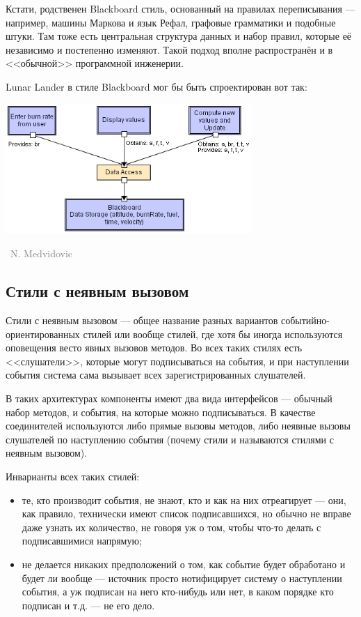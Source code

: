 \documentclass[a5paper]{article}
\newcommand{\attribution}[1] {
    \vspace{-4mm}\begin{flushright}\begin{scriptsize}\textcolor{gray}
    {\textcopyright\, #1}\end{scriptsize}\end{flushright}
}
\begin{document}
Кстати, родственен Blackboard стиль, основанный на правилах переписывания --- например, машины Маркова и язык Рефал, графовые грамматики и подобные штуки. Там тоже есть центральная структура данных и набор правил, которые её независимо и постепенно изменяют. Такой подход вполне распространён и в <<обычной>> программной инженерии.

Lunar Lander в стиле Blackboard мог бы быть спроектирован вот так:

\begin{center}
    \includegraphics[width=0.7\textwidth]{blackboardLL.png}
    \attribution{N. Medvidovic}
\end{center}

\subsection{Стили с неявным вызовом}

Стили с неявным вызовом --- общее название разных вариантов событийно-ориентированных стилей или вообще стилей, где хотя бы иногда используются оповещения весто явных вызовов методов. Во всех таких стилях есть <<слушатели>>, которые могут подписываться на события, и при наступлении события система сама вызывает всех зарегистрированных слушателей.

В таких архитектурах компоненты имеют два вида интерфейсов --- обычный набор методов, и события, на которые можно подписываться. В качестве соединителей используются либо прямые вызовы методов, либо неявные вызовы слушателей по наступлению события (почему стили и называются стилями с неявным вызовом).

Инварианты всех таких стилей:

\begin{itemize}
    \item те, кто производит события, не знают, кто и как на них отреагирует --- они, как правило, технически имеют список подписавшихся, но обычно не вправе даже узнать их количество, не говоря уж о том, чтобы что-то делать с подписавшимися напрямую;
    \item не делается никаких предположений о том, как событие будет обработано и будет ли вообще --- источник просто нотифицирует систему о наступлении события, а уж подписан на него кто-нибудь или нет, в каком порядке кто подписан и т.д. --- не его дело.
\end{itemize}
\end{document}
